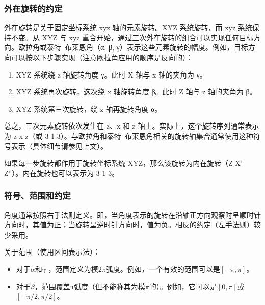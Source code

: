 \subsubsection{外在旋转的约定}

外在旋转是关于固定坐标系统 xyz 轴的元素旋转。XYZ 系统旋转，而 xyz 系统保持不变。从 XYZ 与 xyz 重合开始，通过三次外在旋转的组合可以实现任何目标方向。欧拉角或泰特–布莱恩角（α, β, γ）表示这些元素旋转的幅度。例如，目标方向可以按以下步骤实现（注意欧拉角应用的顺序是反向的）：
\begin{enumerate}
\item XYZ 系统绕 z 轴旋转角度 γ。此时 X 轴与 x 轴的夹角为 γ。
\item XYZ 系统再次旋转，这次绕 x 轴旋转角度 β。此时 Z 轴与 z 轴的夹角为 β。
\item XYZ 系统第三次旋转，绕 z 轴再旋转角度 α。
\end{enumerate}
总之，三次元素旋转依次发生在 z、x 和 z 轴上。实际上，这个旋转序列通常表示为 z-x-z（或 3-1-3）。与欧拉角和泰特–布莱恩角相关的旋转轴集合通常使用这种符号表示（具体细节请参见上文）。

如果每一步旋转都作用于旋转坐标系统 XYZ，那么该旋转为内在旋转（Z-X'-Z''）。内在旋转也可以表示为 3-1-3。
\subsubsection{符号、范围和约定}
角度通常按照右手法则定义。即，当角度表示的旋转在沿轴正方向观察时呈顺时针方向时，其值为正；当旋转呈逆时针方向时，值为负。相反的约定（左手法则）较少采用。

关于范围（使用区间表示法）：

\begin{itemize}
\item 对于$\alpha$和$\gamma$ ，范围定义为模$2\pi$弧度。例如，一个有效的范围可以是$[ -\pi,\pi]$。
\item 对于$\beta$，范围覆盖π弧度（但不能称其为模$\pi$的）。例如，它可以是$[0,\pi]$或$[-\pi/2,\pi/2]$。
\end{itemize}